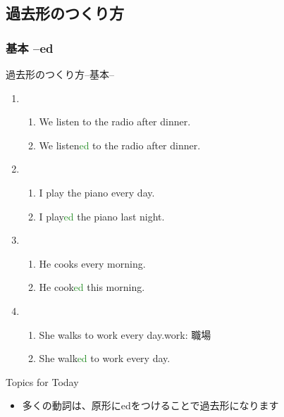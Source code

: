 \documentclass[aspectratio=169,xcolor={dvipsnames,table}]{beamer}
\newcommand{\myaudio}[1]{\href{#1}{\faVolumeUp}}
\begin{document}
\subsection{過去形のつくり方}
\subsubsection{基本 --ed}
\begin{frame}[plain]{過去形のつくり方--基本--}
 
\begin{enumerate}
 \item \begin{enumerate}
	\item We listen to the radio after dinner.
	\item We listen\textcolor{ForestGreen}{ed} to the radio after dinner.
       \end{enumerate}
 \item \begin{enumerate}
	\item I play the piano every day.
	\item I play\textcolor{ForestGreen}{ed} the piano last night.
       \end{enumerate}
 \item \begin{enumerate}
	\item He cooks every morning.
	\item He cook\textcolor{ForestGreen}{ed} this morning.
       \end{enumerate}

 \item \begin{enumerate}
	\item She walks to work every day.\hfill{}{\small work: 職場}
	\item She walk\textcolor{ForestGreen}{ed} to work every day.
       \end{enumerate}
\end{enumerate}

\begin{exampleblock}{Topics for Today}\small
\begin{itemize}
 \item 多くの動詞は、原形にedをつけることで過去形になります
\end{itemize}
\end{exampleblock}
\hfill\myaudio{./audio/025_past_do_02.mp3}

\end{frame}
\end{document}
